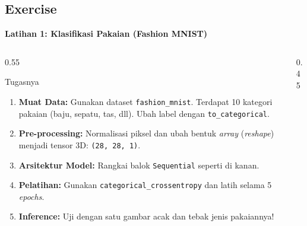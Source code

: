 \documentclass{beamer}
\begin{document}
\subsection{Exercise}
\begin{frame}{\textbf{Latihan 1: Klasifikasi Pakaian (Fashion MNIST)}}
    
    \begin{columns}[c] 
        
        \begin{column}{0.55\textwidth}
            \begin{alertblock}{Tugasnya}
                \small 
                \begin{enumerate}
                    \setlength{\itemsep}{0.1cm} 
                    \item \textbf{Muat Data:} Gunakan dataset \texttt{fashion\_mnist}. Terdapat 10 kategori pakaian (baju, sepatu, tas, dll). Ubah label dengan \texttt{to\_categorical}.
                    \item \textbf{Pre-processing:} Normalisasi piksel dan ubah bentuk \textit{array} (\textit{reshape}) menjadi tensor 3D: \texttt{(28, 28, 1)}.
                    \item \textbf{Arsitektur Model:} Rangkai balok \texttt{Sequential} seperti di kanan.
                    \item \textbf{Pelatihan:} Gunakan \texttt{categorical\_crossentropy} dan latih selama 5 \textit{epochs}.
                    \item \textbf{Inference:} Uji dengan satu gambar acak dan tebak jenis pakaiannya!
                \end{enumerate}
            \end{alertblock}
        \end{column}
        
        \begin{column}{0.45\textwidth}
            \centering
\end{column}
\end{columns}
\end{frame}
\end{document}
